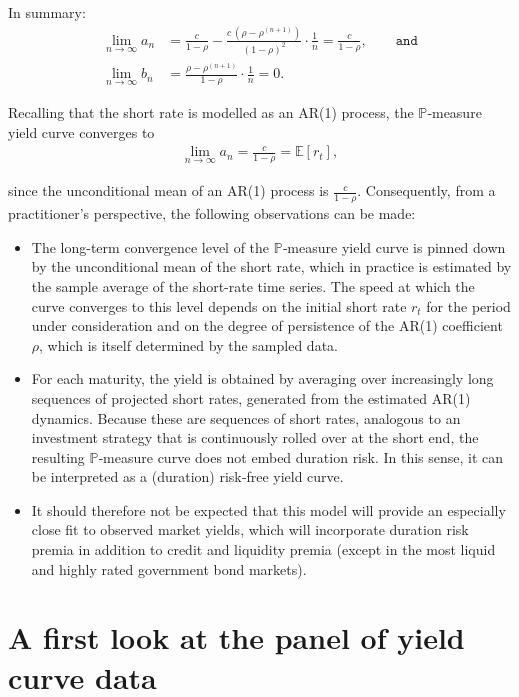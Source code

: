 \documentclass[
  letterpaper,
  DIV=11,
  numbers=noendperiod]{scrreprt}
\begin{document}
In summary:
\begin{align}
    \lim_{n \to \infty} a_n &= \frac{c}{1-\rho} - \frac{c\,(\rho-\rho^{(n+1)})}{(1-\rho)^2} \cdot \frac{1}{n} = \frac{c}{1-\rho}, \qquad \texttt{and} \\
    \lim_{n \to \infty} b_n &= \frac{\rho-\rho^{(n+1)}}{1-\rho} \cdot \frac{1}{n} = 0.
\end{align}

Recalling that the short rate is modelled as an AR(1) process, the
\(\mathbb{P}\)‑measure yield curve converges to
\begin{align}
\lim_{n \to \infty} a_n = \frac{c}{1-\rho} = \mathbb{E}[r_t],
\end{align}

since the unconditional mean of an AR(1) process is
\(\frac{c}{1-\rho}\). Consequently, from a practitioner's perspective,
the following observations can be made:

\begin{itemize}
\item
  The long-term convergence level of the \(\mathbb{P}\)‑measure yield
  curve is pinned down by the unconditional mean of the short rate,
  which in practice is estimated by the sample average of the short-rate
  time series. The speed at which the curve converges to this level
  depends on the initial short rate \(r_t\) for the period under
  consideration and on the degree of persistence of the AR(1)
  coefficient \(\rho\), which is itself determined by the sampled data.
\item
  For each maturity, the yield is obtained by averaging over
  increasingly long sequences of projected short rates, generated from
  the estimated AR(1) dynamics. Because these are sequences of short
  rates, analogous to an investment strategy that is continuously rolled
  over at the short end, the resulting \(\mathbb{P}\)‑measure curve does
  not embed duration risk. In this sense, it can be interpreted as a
  (duration) risk‑free yield curve.
\item
  It should therefore not be expected that this model will provide an
  especially close fit to observed market yields, which will incorporate
  duration risk premia in addition to credit and liquidity premia
  (except in the most liquid and highly rated government bond markets).
\end{itemize}

\section{A first look at the panel of yield curve
data}\label{a-first-look-at-the-panel-of-yield-curve-data}
\end{document}
